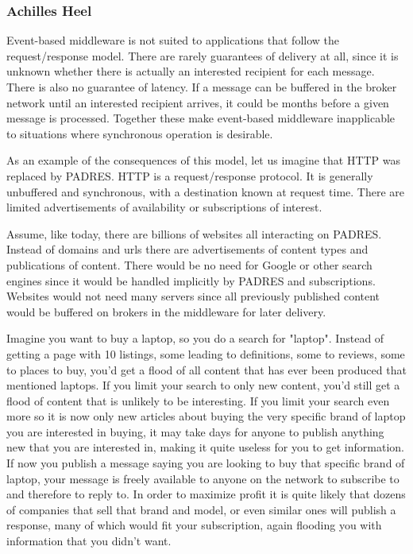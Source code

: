 \documentclass{acm_proc_article-sp}
\begin{document}

\subsubsection{Achilles Heel}
\label{sec:appsebbad}


Event-based middleware is not suited to applications that follow the request/response model. There are rarely guarantees of delivery  at all, since it is unknown whether there is actually an interested recipient for each message. There is also no guarantee of latency. If a message can be buffered in the broker network until an interested recipient arrives, it could be months before a given message is processed. Together these make event-based middleware inapplicable to situations where synchronous operation is desirable.

As an example of the consequences of this model, let us imagine that HTTP was replaced by PADRES. HTTP is a request/response protocol. It is generally unbuffered and synchronous, with a destination known at request time. There are limited advertisements of availability or subscriptions of interest.

Assume, like today, there are billions of websites all interacting on PADRES. Instead of domains and urls there are advertisements of content types and publications of content. There would be no need for Google or other search engines since it would be handled implicitly by PADRES and subscriptions. Websites would not need many servers since all previously published content would be buffered on brokers in the middleware for later delivery.

Imagine you want to buy a laptop, so you do a search for "laptop". Instead of getting a page with 10 listings, some leading to definitions, some to reviews, some to places to buy, you'd get a flood of all content that has ever been produced that mentioned laptops. If you limit your search to only new content, you'd still get a flood of content that is unlikely to be interesting. If you limit your search even more so it is now only new articles about buying the very specific brand of laptop you are interested in buying, it may take days for anyone to publish anything new that you are interested in, making it quite useless for you to get information. If now you publish a message saying you are looking to buy that specific brand of laptop, your message is freely available to anyone on the network to subscribe to and therefore to reply to. In order to maximize profit it is quite likely that dozens of companies that sell that brand and model, or even similar ones will publish a response, many of which would fit your subscription, again flooding you with information that you didn't want.
\end{document}

